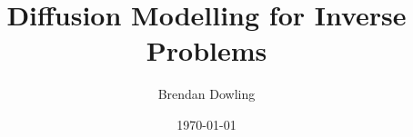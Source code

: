 \documentclass{make_files/statsmsc}
\title{Diffusion Modelling for Inverse Problems}
\author{Brendan Dowling}
\date{\today}
\begin{document}
\maketitle











\clearpage

\renewcommand*{\thepage}{Supplementary Material Page \arabic{page}}
\renewcommand{\thesection}{\Alph{section}}

\appendix

\end{document}
